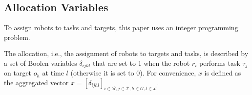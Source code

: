\documentclass[]{interact}
\theoremstyle{plain}%
\theoremstyle{definition}
\theoremstyle{remark}
\begin{document}
    
\subsection{Allocation Variables}
To assign robots to tasks and targets, this paper uses an integer programming problem.

The allocation, i.e., the assignment of robots to targets and tasks, is described by a set of Boolen variables $\delta_{ijhl}$ that are set to 1 when the robot $r_i$ performs task $\tau_j$ on target $o_h$ at time $l$ (otherwise it is set to 0).
For convenience, $x$ is defined as the aggregated vector $x=[\delta_{ijhl}]_{i\in\mathcal{R},j\in\mathcal{T},h\in\mathcal{O},l\in\mathcal{L}}$.
\end{document}
